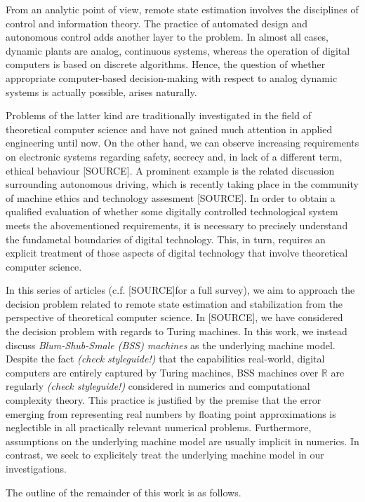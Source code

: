 \documentclass[conference]{IEEEtran}
\def\RR{{\mathbb R}}
\newcommand{\sdummy}{{\color{red}[SOURCE]}}
\begin{document}
	From an analytic point of view, remote state estimation involves the disciplines of control and information theory. 
	The practice of automated design and autonomous control adds another layer to the problem. In almost all cases, dynamic plants are analog, continuous  systems, 
	whereas the operation of digital computers is based on discrete algorithms. Hence, the question of whether appropriate computer-based decision-making with respect to analog 
	dynamic systems is actually possible, arises naturally. 

	Problems of the latter kind are traditionally investigated in the field of theoretical computer science and have not gained much attention in applied engineering until now. 
	On the other hand, we can observe increasing requirements on electronic systems regarding safety, secrecy and, in lack of a different term, ethical behaviour \sdummy. 
	A prominent example is the related discussion surrounding autonomous driving, which is recently taking place in the community of machine ethics and technology assesment \sdummy. 
	In order to obtain a qualified evaluation of whether some digitally controlled technological system meets the abovementioned requirements, it is necessary to precisely understand 
	the fundametal boundaries of digital technology. This, in turn, requires an explicit treatment of those aspects of digital technology that involve theoretical computer science.

	In this series of articles (c.f. \sdummy for a full survey), we aim to approach the decision problem related to remote state estimation and stabilization from the perspective 
	of theoretical computer science. In \sdummy, we have considered the decision problem with regards to Turing machines. In this work, we instead discuss 
	\emph{Blum-Shub-Smale (BSS) machines} as the underlying machine model. Despite the {\color{red} fact \emph{(check styleguide!)}} that the capabilities real-world, digital computers are 
	entirely captured by Turing machines, BSS machines over \(\RR\) are {\color{red} regularly \emph{(check styleguide!)}} considered in numerics and computational complexity theory. 
	This practice is justified by the premise that the error emerging from representing real numbers by floating point approximations is neglectible in all practically relevant numerical problems. 
	Furthermore, assumptions on the underlying machine model are usually implicit in numerics. In contrast, we seek to explicitely treat the underlying machine model in our investigations.

	The outline of the remainder of this work is as follows.
\end{document}
